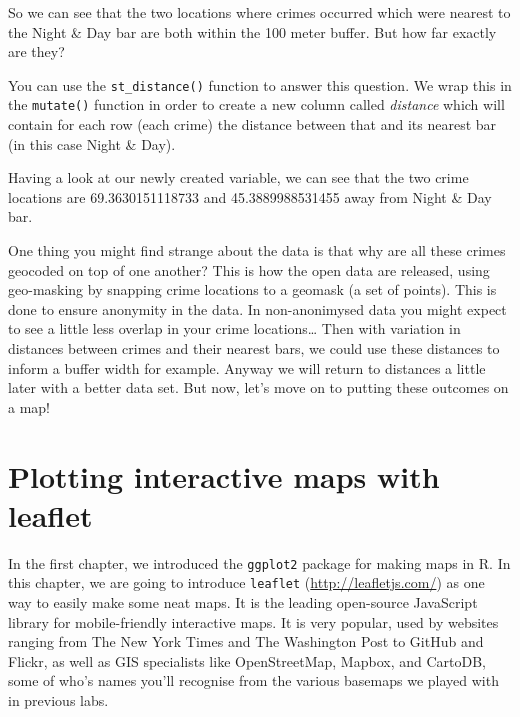 \documentclass[
]{book}
\newenvironment{Shaded}{\begin{snugshade}}{\end{snugshade}}
\newcommand{\AttributeTok}[1]{\textcolor[rgb]{0.77,0.63,0.00}{#1}}
\newcommand{\FunctionTok}[1]{\textcolor[rgb]{0.00,0.00,0.00}{#1}}
\newcommand{\NormalTok}[1]{#1}
\newcommand{\OtherTok}[1]{\textcolor[rgb]{0.56,0.35,0.01}{#1}}
\newcommand{\SpecialCharTok}[1]{\textcolor[rgb]{0.00,0.00,0.00}{#1}}
\begin{document}
So we can see that the two locations where crimes occurred which were nearest to the Night \& Day bar are both within the 100 meter buffer. But how far exactly are they?

You can use the \texttt{st\_distance()} function to answer this question. We wrap this in the \texttt{mutate()} function in order to create a new column called \emph{distance} which will contain for each row (each crime) the distance between that and its nearest bar (in this case Night \& Day).

\begin{Shaded}
\end{Shaded}

Having a look at our newly created variable, we can see that the two crime locations are 69.3630151118733 and 45.3889988531455 away from Night \& Day bar.

One thing you might find strange about the data is that why are all these crimes geocoded on top of one another? This is how the open data are released, using geo-masking by snapping crime locations to a geomask (a set of points). This is done to ensure anonymity in the data. In non-anonimysed data you might expect to see a little less overlap in your crime locations\ldots{} Then with variation in distances between crimes and their nearest bars, we could use these distances to inform a buffer width for example. Anyway we will return to distances a little later with a better data set. But now, let's move on to putting these outcomes on a map!

\hypertarget{plotting-interactive-maps-with-leaflet}{%
\section{Plotting interactive maps with leaflet}\label{plotting-interactive-maps-with-leaflet}}

In the first chapter, we introduced the \texttt{ggplot2} package for making maps in R. In this chapter, we are going to introduce \texttt{leaflet} (\url{http://leafletjs.com/}) as one way to easily make some neat maps. It is the leading open-source JavaScript library for mobile-friendly interactive maps. It is very popular, used by websites ranging from The New York Times and The Washington Post to GitHub and Flickr, as well as GIS specialists like OpenStreetMap, Mapbox, and CartoDB, some of who's names you'll recognise from the various basemaps we played with in previous labs.
\end{document}
